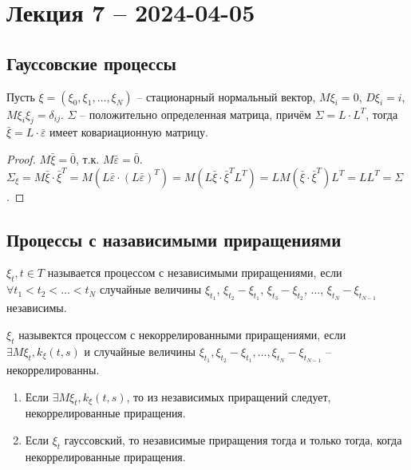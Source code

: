 \section{Лекция 7 -- 2024-04-05}

\subsection{Гауссовские процессы}

\begin{theorem}
  Пусть $\xi = (\xi_0, \xi_1, \dots, \xi_N)$ -- стационарный нормальный вектор,
  $M\xi_i = 0$, $D\xi_i = i$, $M\xi_i \xi_j = \delta_{ij}$. $\Sigma$ -- положительно определенная матрица,
  причём $\Sigma = L \cdot L^T$, тогда $\bar{\xi} = L \cdot \bar{\varepsilon}$ имеет ковариационную матрицу.
\end{theorem}
\begin{proof}
  $M\bar{\xi} = \bar{0}$, т.к. $M\bar{\varepsilon} = \bar{0}$.
  $\Sigma_{\xi} = M \bar{\xi} \cdot \bar{\xi}^T = M(L \bar{\varepsilon} \cdot (L\bar{\varepsilon})^T) = M(L \bar{\xi} \cdot \bar{\xi}^T L^T) = L M(\bar{\xi} \cdot \bar{\xi}^T) L^T = L L^T = \Sigma$.
\end{proof}



\subsection{Процессы с назависимыми приращениями}

\begin{definition}
  $\xi_t, t \in T$ называется процессом с независимыми приращениями, если
  $\forall t_1 < t_2 < \dots < t_N$ случайные величины $\xi_{t_1}$, $\xi_{t_2}-\xi_{t_1}$,
  $\xi_{t_3}-\xi_{t_2}$, $\dots$, $\xi_{t_N} - \xi_{t_{N-1}}$ независимы.
\end{definition}

\begin{definition}
  $\xi_t$ назывектся процессом с некоррелированными приращениями, если
  $\exists M \xi_t, k_\xi (t, s)$ и случайные величины $\xi_{t_1}, \xi_{t_2}-\xi_{t_1}, \dots, \xi_{t_N} - \xi_{t_{N-1}}$ -- некоррелированны.
\end{definition}

\begin{remark}
  \begin{enumerate}
      \item Если $\exists M \xi_{t}, k_\xi(t, s)$, то из независимых приращений
        следует, некоррелированные приращения.

      \item Если $\xi_t$ гауссовский, то независимые приращения тогда и только тогда, 
        когда некоррелированные приращения.
  \end{enumerate}
\end{remark}

